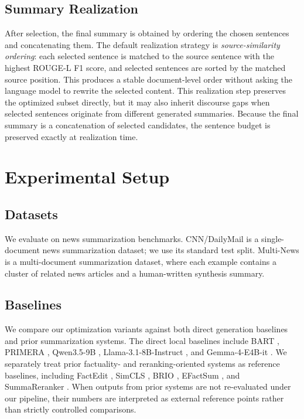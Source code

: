 \documentclass[11pt]{article}
\begin{document}
\subsection{Summary Realization}

After selection, the final summary is obtained by ordering the chosen sentences and concatenating them. The default realization strategy is \emph{source-similarity ordering}: each selected sentence is matched to the source sentence with the highest ROUGE-L F1 score, and selected sentences are sorted by the matched source position. This produces a stable document-level order without asking the language model to rewrite the selected content. This realization step preserves the optimized subset directly, but it may also inherit discourse gaps when selected sentences originate from different generated summaries. Because the final summary is a concatenation of selected candidates, the sentence budget is preserved exactly at realization time.

\section{Experimental Setup}
\subsection{Datasets}
We evaluate on news summarization benchmarks. CNN/DailyMail \cite{nallapati-etal-2016-abstractive} is a single-document news summarization dataset; we use its standard test split. Multi-News \cite{fabbri-etal-2019-multi} is a multi-document summarization dataset, where each example contains a cluster of related news articles and a human-written synthesis summary.

\subsection{Baselines}
We compare our optimization variants against both direct generation baselines and prior summarization systems. The direct local baselines include BART \cite{lewis-etal-2020-bart}, PRIMERA \cite{xiao-etal-2022-primera}, Qwen3.5-9B \cite{qwenteam2026qwen35omnitechnicalreport}, Llama-3.1-8B-Instruct \cite{llama3modelcard}, and Gemma-4-E4B-it \cite{gemma2024, gemma4_e4b_it}. We separately treat prior factuality- and reranking-oriented systems as reference baselines, including FactEdit \cite{balachandran-etal-2022-correcting}, SimCLS \cite{liu-liu-2021-simcls}, BRIO \cite{liu-etal-2022-brio}, EFactSum \cite{dixit-etal-2023-improving}, and SummaReranker \cite{ravaut-etal-2022-summareranker}. When outputs from prior systems are not re-evaluated under our pipeline, their numbers are interpreted as external reference points rather than strictly controlled comparisons.
\end{document}
